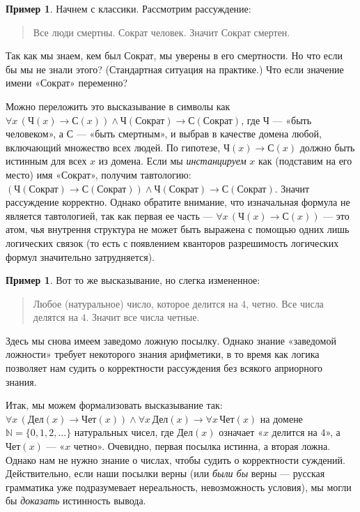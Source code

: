 \documentclass[12pt,notitlepage]{article}
\theoremstyle{plain}
\theoremstyle{definition}
\newtheorem{exm}[thm]{Пример}
\theoremstyle{plain}
\newcommand{\N}{\mathbb{N}}
\newcommand{\1}{\mathbf{1}}
\newcommand{\0}{\mathbf{0}}
\newcommand{\mcomm}[1]{}
\begin{document}
\begin{exm}
	Начнем с классики. Рассмотрим рассуждение:
	\begin{quote}
		Все люди смертны. Сократ человек. Значит Сократ смертен.
	\end{quote}
	Так как мы знаем, кем был Сократ, мы уверены в его смертности. Но что если бы мы не знали этого? (Стандартная ситуация на практике.) Что если значение имени «Сократ» переменно?
	
	Можно переложить это высказывание в символы как $\forall x\, (\text{Ч}(x) \to \text{С}(x)) \wedge \text{Ч}(\text{Сократ}) \to \text{С}(\text{Сократ})$, где $\text{Ч}$ --- «быть человеком», а $\text{С}$ --- «быть смертным», и выбрав в качестве домена любой, включающий множество всех людей. По гипотезе, $\text{Ч}(x) \to \text{С}(x)$ должно быть истинным для всех $x$ из домена. Если мы \emph{инстанцируем} $x$ как (подставим на его место) имя «Сократ», получим тавтологию: $(\text{Ч}(\text{Сократ}) \to \text{С}(\text{Сократ})) \wedge \text{Ч}(\text{Сократ}) \to \text{С}(\text{Сократ})$. Значит рассуждение корректно. Однако обратите внимание, что изначальная формула не является тавтологией, так как первая ее часть --- $\forall x\, (\text{Ч}(x) \to \text{С}(x))$ --- это атом, чья внутрення структура не может быть выражена с помощью одних лишь логических связок (то есть с появлением кванторов разрешимость логических формул значительно затрудняется).
\end{exm}
\mcomm{}

\begin{exm}
	Вот то же высказывание, но слегка измененное:
\end{exm}
\begin{quote}
	Любое (натуральное) число, которое делится на $4$, четно. Все числа делятся на $4$. Значит все числа четные.
\end{quote}
Здесь мы снова имеем заведомо ложную посылку. Однако знание «заведомой ложности» требует некоторого знания арифметики, в то время как логика позволяет нам судить о корректности рассуждения без всякого априорного знания.

Итак, мы можем формализовать высказывание так: $\forall x\, (\text{Дел}(x) \to \text{Чет}(x)) \wedge \forall x\, \text{Дел}(x) \to \forall x\, \text{Чет}(x)$ на домене $\N = \{0,1,2,\ldots\}$ натуральных чисел, где $\text{Дел}(x)$ означает «$x$ делится на $4$», а $\text{Чет}(x)$ --- «$x$ четно». Очевидно, первая посылка истинна, а вторая ложна. Однако нам не нужно знание о числах, чтобы судить о корректности суждений. Действительно, если наши посылки верны (или \emph{были бы} верны --- русская грамматика уже подразумевает нереальность, невозможность условия), мы могли бы \emph{доказать} истинность вывода.
\end{document}
